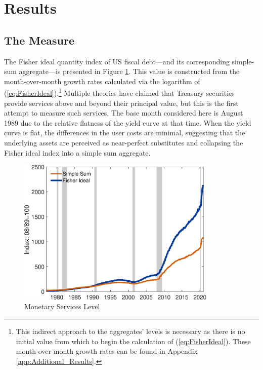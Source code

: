 \documentclass[11pt,a4paper,margin=1.5in]{article}
\begin{document}
\section{Results}
\label{sec:Results}

\subsection{The Measure}
\label{subsec:Results_Measure}

The Fisher ideal quantity index of US fiscal debt---and its corresponding simple-sum aggregate---is presented in Figure \ref{fig:MS_Index}.
This value is constructed from the month-over-month growth rates calculated via the logarithm of (\ref{eq:FisherIdeal}).\footnote{
	This indirect approach to the aggregates' levels is necessary as there is no initial value from which to begin the calculation of (\ref{eq:FisherIdeal}).
	These month-over-month growth rates can be found in Appendix \ref{app:Additional_Results}.
}
Multiple theories have claimed that Treasury securities provide services above and beyond their principal value, but this is the first attempt to measure such services. 
The base month considered here is August 1989 due to the relative flatness of the yield curve at that time.
When the yield curve is flat, the differences in the user costs are minimal, suggesting that the underlying assets are perceived as near-perfect substitutes and collapsing the Fisher ideal index into a simple sum aggregate. 
\begin{figure}[h]
	\centering
	\includegraphics[width=0.85\textwidth]{../Figures/FisherIndex_v2.eps}
	\caption{Monetary Services Level}
	\label{fig:MS_Index}
\end{figure}
\end{document}

